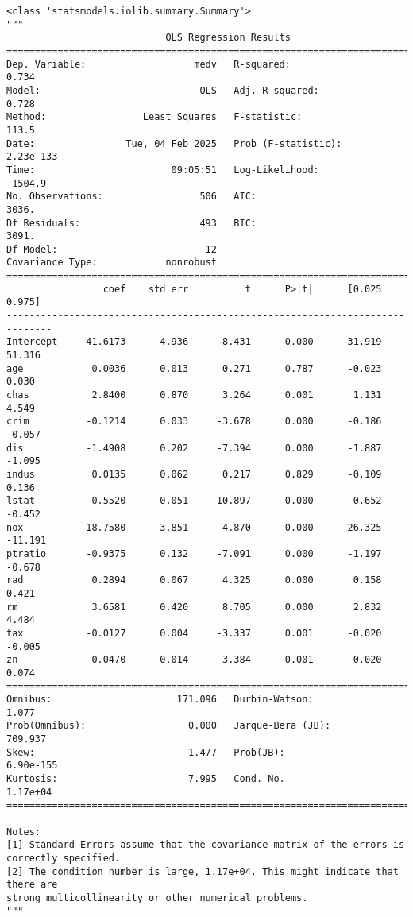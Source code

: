 \documentclass[
  letterpaper,
  DIV=11,
  numbers=noendperiod]{scrreprt}
\begin{document}
\begin{verbatim}
<class 'statsmodels.iolib.summary.Summary'>
"""
                            OLS Regression Results                            
==============================================================================
Dep. Variable:                   medv   R-squared:                       0.734
Model:                            OLS   Adj. R-squared:                  0.728
Method:                 Least Squares   F-statistic:                     113.5
Date:                Tue, 04 Feb 2025   Prob (F-statistic):          2.23e-133
Time:                        09:05:51   Log-Likelihood:                -1504.9
No. Observations:                 506   AIC:                             3036.
Df Residuals:                     493   BIC:                             3091.
Df Model:                          12                                         
Covariance Type:            nonrobust                                         
==============================================================================
                 coef    std err          t      P>|t|      [0.025      0.975]
------------------------------------------------------------------------------
Intercept     41.6173      4.936      8.431      0.000      31.919      51.316
age            0.0036      0.013      0.271      0.787      -0.023       0.030
chas           2.8400      0.870      3.264      0.001       1.131       4.549
crim          -0.1214      0.033     -3.678      0.000      -0.186      -0.057
dis           -1.4908      0.202     -7.394      0.000      -1.887      -1.095
indus          0.0135      0.062      0.217      0.829      -0.109       0.136
lstat         -0.5520      0.051    -10.897      0.000      -0.652      -0.452
nox          -18.7580      3.851     -4.870      0.000     -26.325     -11.191
ptratio       -0.9375      0.132     -7.091      0.000      -1.197      -0.678
rad            0.2894      0.067      4.325      0.000       0.158       0.421
rm             3.6581      0.420      8.705      0.000       2.832       4.484
tax           -0.0127      0.004     -3.337      0.001      -0.020      -0.005
zn             0.0470      0.014      3.384      0.001       0.020       0.074
==============================================================================
Omnibus:                      171.096   Durbin-Watson:                   1.077
Prob(Omnibus):                  0.000   Jarque-Bera (JB):              709.937
Skew:                           1.477   Prob(JB):                    6.90e-155
Kurtosis:                       7.995   Cond. No.                     1.17e+04
==============================================================================

Notes:
[1] Standard Errors assume that the covariance matrix of the errors is correctly specified.
[2] The condition number is large, 1.17e+04. This might indicate that there are
strong multicollinearity or other numerical problems.
"""
\end{verbatim}
\end{document}
